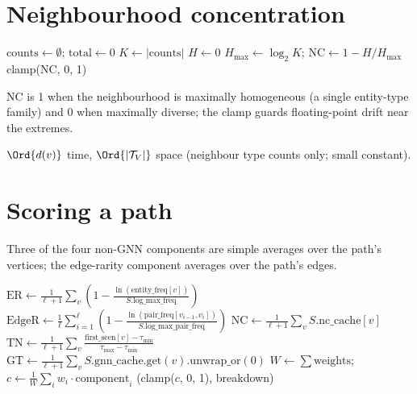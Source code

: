 \section{Neighbourhood concentration}

\begin{algorithm}
\caption{\textsc{Compute-NC}}\label{alg:compute-nc}
$\mathrm{counts} \gets \emptyset$; $\mathrm{total} \gets 0$\;
$K \gets |\mathrm{counts}|$\;
$H \gets 0$\;
$H_{\max} \gets \log_2 K$; $\mathrm{NC} \gets 1 - H / H_{\max}$\;
\Return clamp($\mathrm{NC}$, 0, 1)\;
\end{algorithm}

$\mathrm{NC}$ is 1 when the neighbourhood is maximally homogeneous
(a single entity-type family) and 0 when maximally diverse; the
clamp guards floating-point drift near the extremes.

\begin{complexity}
$\Ord{d(v)}$ time, $\Ord{|\mathcal{T}_V|}$ space (neighbour
type counts only; small constant).
\end{complexity}

\section{Scoring a path}

Three of the four non-GNN components are simple averages over the
path's vertices; the edge-rarity component averages over the path's
edges.

\begin{algorithm}
\caption{\textsc{Score-Path}}\label{alg:score-path}
$\mathrm{ER} \gets \frac{1}{\ell+1} \sum_v \left(1 - \frac{\ln(\text{entity\_freq}[v])}{S.\text{log\_max\_freq}}\right)$\;
$\mathrm{EdgeR} \gets \frac{1}{\ell} \sum_{i=1}^{\ell} \left(1 - \frac{\ln(\text{pair\_freq}[v_{i-1}, v_i])}{S.\text{log\_max\_pair\_freq}}\right)$\;
$\mathrm{NC} \gets \frac{1}{\ell+1} \sum_v S.\text{nc\_cache}[v]$\;
$\mathrm{TN} \gets \frac{1}{\ell+1} \sum_v \frac{\text{first\_seen}[v] - \tau_{\min}}{\tau_{\max} - \tau_{\min}}$\;
$\mathrm{GT} \gets \frac{1}{\ell+1} \sum_v S.\text{gnn\_cache}.\text{get}(v).\text{unwrap\_or}(0)$\;
$W \gets \sum \text{weights}$; $c \gets \frac{1}{W} \sum_i w_i \cdot \text{component}_i$\;
\Return (clamp($c$, 0, 1), breakdown)\;
\end{algorithm}

